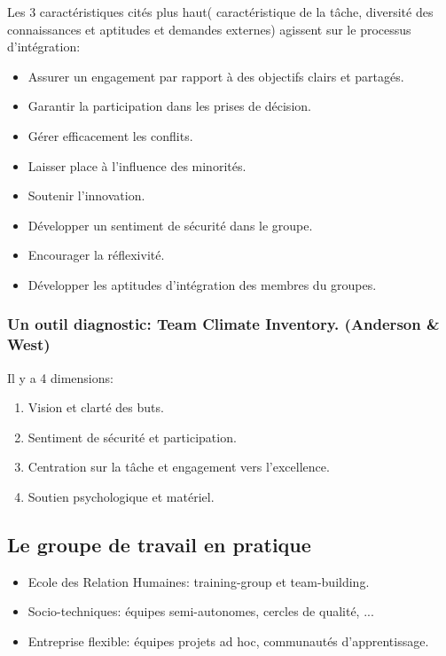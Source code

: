 \documentclass[12pt]{article}
\begin{document}
	 Les 3 caractéristiques cités plus haut( caractéristique de la tâche, diversité des connaissances et aptitudes et demandes externes) agissent sur le processus d'intégration:
	 \begin{itemize}
	 \item Assurer un engagement par rapport à des objectifs clairs et partagés.
	 \item Garantir la participation dans les prises de décision.
	 \item Gérer efficacement les conflits.
	 \item Laisser place à l'influence des minorités.
	 \item Soutenir l'innovation.
	 \item Développer un sentiment de sécurité dans le groupe.
	 \item Encourager la réflexivité.
	 \item Développer les aptitudes d’intégration des membres du groupes.
	 \end{itemize}
	 
	 \subsubsection*{Un outil diagnostic: Team Climate Inventory. (Anderson \& West)}
	 
	 Il y a 4 dimensions:
	 \begin{enumerate}
	 \item Vision et clarté des buts.
	 \item Sentiment de sécurité et participation.
	 \item Centration sur la tâche et engagement vers l'excellence.
	 \item Soutien psychologique et matériel.
	 \end{enumerate}
	
	\subsection{Le groupe de travail en pratique}
		
	\begin{itemize}
	\item Ecole des Relation Humaines: training-group et team-building.
	\item Socio-techniques: équipes semi-autonomes, cercles de qualité, ...
	\item Entreprise flexible: équipes projets ad hoc, communautés d'apprentissage.
\end{itemize}		
\end{document}
